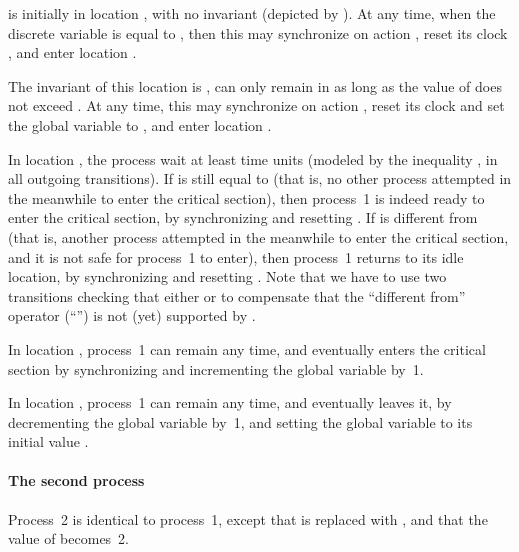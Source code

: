  is initially in location , with no invariant (depicted by ).
At any time, when the discrete variable  is equal to , then this \IPTA{} may synchronize on action , reset its clock , and enter location .

The invariant of this location is , \ie{}  can only remain in  as long as the value of  does not exceed .
At any time, this \IPTA{} may synchronize on action , reset its clock  and set the global variable  to , and enter location .

In location , the process wait at least  time units (modeled by the inequality , in all outgoing transitions).
If  is still equal to  (that is, no other process attempted in the meanwhile to enter the critical section), then process~1 is indeed ready to enter the critical section, by synchronizing  and resetting .
If  is different from  (that is, another process attempted in the meanwhile to enter the critical section, and it is not safe for process~1 to enter), then process~1 returns to its idle location, by synchronizing  and resetting .
Note that we have to use two transitions checking that either  or  to compensate that the ``different from'' operator (``\styleIMI{$\neq$}'') is not (yet) supported by \imitator{}.

In location , process~1 can remain any time, and eventually enters the critical section by synchronizing  and incrementing the global variable  by~1.

In location , process~1 can remain any time, and eventually leaves it, by decrementing the global variable  by~1, and setting the global variable  to its initial value .

\paragraph{The second process}
Process~2 is identical to process~1, except that  is replaced with , and that the value of  becomes~2.


